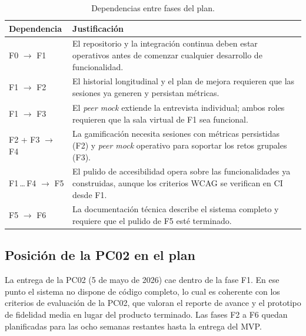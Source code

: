 \begin{table}[ht]
\centering\footnotesize
\renewcommand{\arraystretch}{1.25}
\begin{tabularx}{\linewidth}{@{}p{3.0cm} Y@{}}
\toprule
\textbf{Dependencia} & \textbf{Justificación} \\
\midrule
F0 $\rightarrow$ F1 & El repositorio y la integración continua deben
estar operativos antes de comenzar cualquier desarrollo de
funcionalidad. \\
\addlinespace
F1 $\rightarrow$ F2 & El historial longitudinal y el plan de mejora
requieren que las sesiones ya generen y persistan métricas. \\
\addlinespace
F1 $\rightarrow$ F3 & El \textit{peer mock} extiende la entrevista
individual; ambos roles requieren que la sala virtual de F1 sea
funcional. \\
\addlinespace
F2 + F3 $\rightarrow$ F4 & La gamificación necesita sesiones con
métricas persistidas (F2) y \textit{peer mock} operativo para
soportar los retos grupales (F3). \\
\addlinespace
F1\,\dots\,F4 $\rightarrow$ F5 & El pulido de accesibilidad opera
sobre las funcionalidades ya construidas, aunque los criterios WCAG
se verifican en CI desde F1. \\
\addlinespace
F5 $\rightarrow$ F6 & La documentación técnica describe el sistema
completo y requiere que el pulido de F5 esté terminado. \\
\bottomrule
\end{tabularx}
\caption{Dependencias entre fases del plan.}
\label{tab:gantt-dependencias}
\end{table}

\subsection{Posición de la PC02 en el plan}

La entrega de la PC02 (5 de mayo de 2026) cae dentro de la fase F1.
En ese punto el sistema no dispone de código completo, lo cual es
coherente con los criterios de evaluación de la PC02, que valoran el
reporte de avance y el prototipo de fidelidad media en lugar del
producto terminado. Las fases F2 a F6 quedan planificadas para las
ocho semanas restantes hasta la entrega del MVP.

